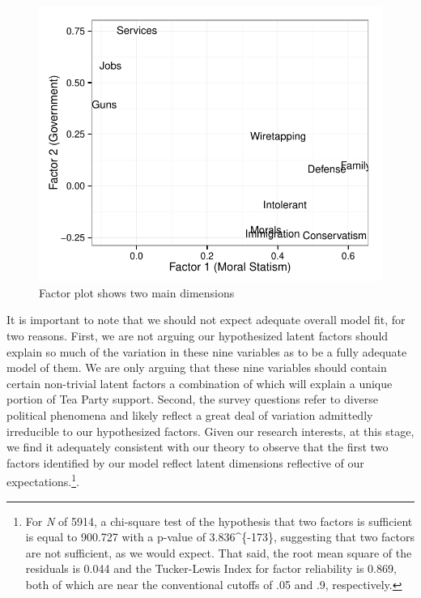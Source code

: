 \documentclass[12pt,]{article}
\begin{document}
\begin{figure}[htbp]
\centering
\includegraphics{figures/factorplot-1.pdf}
\caption{Factor plot shows two main dimensions}
\end{figure}

It is important to note that we should not expect adequate overall model
fit, for two reasons. First, we are not arguing our hypothesized latent
factors should explain so much of the variation in these nine variables
as to be a fully adequate model of them. We are only arguing that these
nine variables should contain certain non-trivial latent factors a
combination of which will explain a unique portion of Tea Party support.
Second, the survey questions refer to diverse political phenomena and
likely reflect a great deal of variation admittedly irreducible to our
hypothesized factors. Given our research interests, at this stage, we
find it adequately consistent with our theory to observe that the first
two factors identified by our model reflect latent dimensions reflective
of our expectations.\footnote{For \emph{N} of 5914, a chi-square test of
  the hypothesis that two factors is sufficient is equal to 900.727 with
  a p-value of 3.836\^{}\{-173\}, suggesting that two factors
  are not sufficient, as we would expect. That said, the root mean
  square of the residuals is 0.044 and the Tucker-Lewis Index for factor
  reliability is 0.869, both of which are near the conventional cutoffs
  of .05 and .9, respectively.}.
\end{document}
